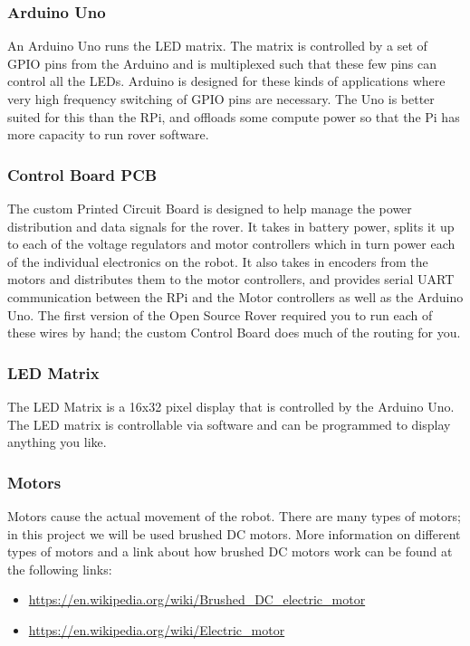 \documentclass{article}
\begin{document}
\subsubsection{Arduino Uno}
An Arduino Uno runs the LED matrix. The matrix is controlled by a set of GPIO pins from the Arduino and is multiplexed such that these few pins can control all the LEDs. Arduino is designed for these kinds of applications where very high frequency switching of GPIO pins are necessary.  The Uno is better suited for this than the RPi, and offloads some compute power so that the Pi has more capacity to run rover software.
\subsubsection{Control Board PCB}
The custom Printed Circuit Board is designed to help manage the power distribution and data signals for the rover. It takes in battery power, splits it up to each of the voltage regulators and motor controllers which in turn power each of the individual electronics on the robot. It also takes in encoders from the motors and distributes them to the motor controllers, and provides serial UART communication between the RPi and the Motor controllers as well as the Arduino Uno.  The first version of the Open Source Rover required you to run each of these wires by hand; the custom Control Board does much of the routing for you.

\subsubsection{LED Matrix}
The LED Matrix is a 16x32 pixel display that is controlled by the Arduino Uno.  The LED matrix is controllable via software and can be programmed to display anything you like.

\subsubsection{Motors}
Motors cause the actual movement of the robot. There are many types of motors; in this project we will be used brushed DC motors. More information on different types of motors and a link about how brushed DC motors work can be found at the following links:
\begin{itemize}
	\item \href{https://en.wikipedia.org/wiki/Brushed_DC_electric_motor}{https://en.wikipedia.org/wiki/Brushed\_DC\_electric\_motor}
	\item \href{https://en.wikipedia.org/wiki/Electric_motor}{https://en.wikipedia.org/wiki/Electric\_motor}
\end{itemize}
\end{document}
